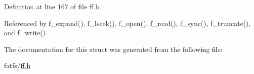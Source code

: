 Definition at line 167 of file ff.\+h.



Referenced by f\+\_\+expand(), f\+\_\+lseek(), f\+\_\+open(), f\+\_\+read(), f\+\_\+sync(), f\+\_\+truncate(), and f\+\_\+write().



The documentation for this struct was generated from the following file\+:\begin{DoxyCompactItemize}
\item 
fatfs/\hyperlink{ff_8h}{ff.\+h}\end{DoxyCompactItemize}
